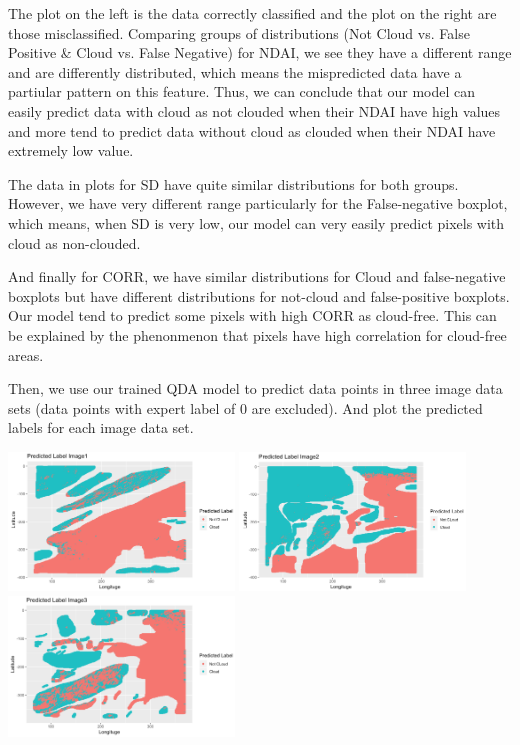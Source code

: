 \documentclass[11pt]{article}
\begin{document}
The plot on the left is the data correctly classified and the plot on the right are those misclassified. Comparing groups of distributions (Not Cloud vs. False Positive \& Cloud vs. False Negative) for NDAI, we see they have a different range and are differently distributed, which means the mispredicted data have a partiular pattern on this feature. Thus, we can conclude that our model can easily predict data with cloud as not clouded when their NDAI have high values and more tend to predict data without cloud as clouded when their NDAI have extremely low value. 

The data in plots for SD have quite similar distributions for both groups. However, we have very different range particularly for the False-negative boxplot, which means, when SD is very low, our model can very easily predict pixels with cloud as non-clouded.

And finally for CORR, we have similar distributions for Cloud and false-negative boxplots but have different distributions for not-cloud and false-positive boxplots. Our model tend to predict some pixels with high CORR as cloud-free. This can be explained by the phenonmenon that pixels have high correlation for cloud-free areas. 

Then, we use our trained QDA model to predict data points in three image data sets (data points with expert label of 0 are excluded). And plot the predicted labels for each image data set.

\includegraphics[width = 6cm]{4(b)7}
\includegraphics[width = 6cm]{4(b)8}
\includegraphics[width = 6cm]{4(b)9}
\end{document}
